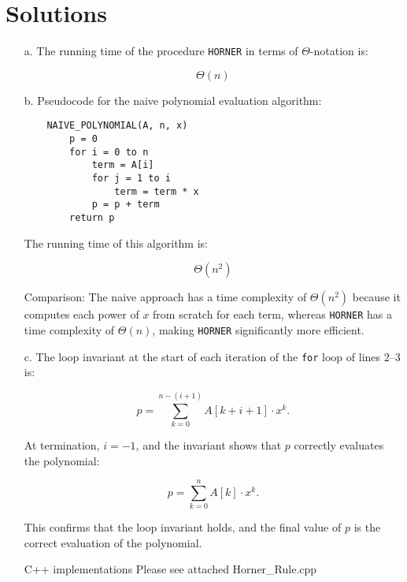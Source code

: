 \documentclass{article}
\begin{document}
\section*{Solutions}

\begin{enumerate}
    \item[a.] The running time of the procedure \texttt{HORNER} in terms of $\Theta$-notation is:
    
    \[
    \Theta(n)
    \]
    
    \item[b.] Pseudocode for the naive polynomial evaluation algorithm:
    
    \begin{verbatim}
    NAIVE_POLYNOMIAL(A, n, x)
        p = 0
        for i = 0 to n
            term = A[i]
            for j = 1 to i
                term = term * x
            p = p + term
        return p
    \end{verbatim}
    
    The running time of this algorithm is:
    
    \[
    \Theta(n^2)
    \]
    
    Comparison: The naive approach has a time complexity of $\Theta(n^2)$ because it computes each power of $x$ from scratch for each term, whereas \texttt{HORNER} has a time complexity of $\Theta(n)$, making \texttt{HORNER} significantly more efficient.
    
    \item[c.] The loop invariant at the start of each iteration of the \texttt{for} loop of lines 2–3 is:
    
    \[
    p = \sum_{k=0}^{n-(i+1)} A[k + i + 1] \cdot x^k.
    \]
    
    At termination, $i = -1$, and the invariant shows that $p$ correctly evaluates the polynomial:
    
    \[
    p = \sum_{k=0}^{n} A[k] \cdot x^k.
    \]
    
    This confirms that the loop invariant holds, and the final value of $p$ is the correct evaluation of the polynomial.

C++ implementations Please see attached Horner_Rule.cpp


\end{enumerate}
\end{document}
